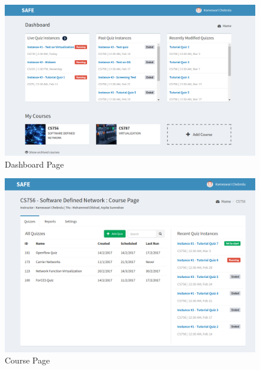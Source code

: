 \begin{figure}[h!]
\begin{center}
\includegraphics[scale=.4]{diagrams/new-ui-1} 
\vspace{1cm}
\caption{Dashboard Page}
\end{center}
\end{figure}


\begin{figure}[h!]
\begin{center}
\includegraphics[scale=.35]{diagrams/new-ui-2} 
\caption{Course Page}
\end{center}
\end{figure}

